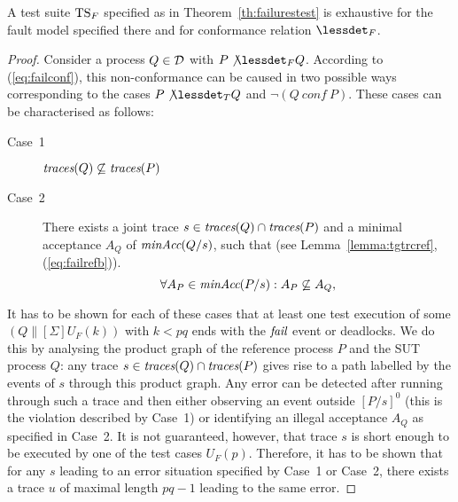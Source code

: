 %
\begin{lemma}\label{lemma:mainfexhaustive}
A test suite ${\text{TS}}_F$ specified as in Theorem~\ref{th:failurestest} is
exhaustive for the fault model specified there and for conformance relation $\lessdet_F$.
\end{lemma}
\begin{proof}
Consider a process $Q\in{\cal D}$ with $P\not\lessdet_F Q$. According to
(\ref{eq:failconf}), this non-conformance can be caused in two possible ways
corresponding to the cases $P\not\lessdet_T Q$ and $\neg(Q\ conf\ P)$. These
cases can be characterised as follows:
\begin{description}
\item[Case~1] $\text{\it traces}(Q)\not\subseteq \text{\it traces}(P)$
\item[Case~2] There exists a joint trace $s\in\text{\it traces}(Q)\cap\text{\it traces}(P)$ and a minimal acceptance $A_Q$
of $\text{\it minAcc}(Q/s)$, such that
(see Lemma~\ref{lemma:tgtrcref}, (\ref{eq:failrefb})).
\begin{equation}
\label{eq:accsnotcontained}
\forall A_P\in\text{\it minAcc}(P/s): A_P\not\subseteq A_Q,
\end{equation}
\end{description}
It has to be shown for each of these cases that at least one test execution
of some $(Q\parallel[\Sigma] U_F(k))$ with $k < pq$ ends with the ${\text{\it fail}}$
event or deadlocks. We do this by analysing the product graph of the reference
process $P$ and the SUT process $Q$: any trace $s\in\text{\it traces}(Q)\cap\text{\it traces}(P)$ gives rise to 
a path labelled by the events of $s$ 
through this product graph. Any error can be detected after running through such a trace
and then either observing an event outside $[P/s]^0$ (this is the violation described
by Case~1) or identifying an illegal acceptance $A_Q$ as specified in Case~2. 
It is not guaranteed, however, that trace $s$ is short enough to be executed by one of the 
test cases $U_F(p)$. Therefore, it has to be shown that for any $s$ leading to an error
situation specified by Case~1 or Case~2, there exists a trace $u$ of maximal length $pq-1$
leading to the same error.




\end{proof}

